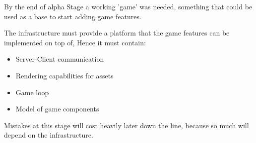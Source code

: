 By the end of alpha Stage a working 'game' was needed, something that could be used as a base to start adding game features.

The infrastructure must provide a platform that the game features can be implemented on top of, Hence it must contain:
\begin{itemize}
\item Server-Client communication
\item Rendering capabilities for assets
\item Game loop
\item Model of game components
\end{itemize}

Mistakes at this stage will cost heavily later down the line, because so much will depend on the infrastructure. 

\begin{comment}

alpha stage layout
------------------
features wanted at this stage:
    - networking
    - server client loop
    - game update model (lock-step no no no)
    - ship move orders
    - world rendering(easy debugging)
    - more focus around infrastructure than features

  - lack of libraries, implemeintg our own networking, GUI library.
  - implementation of network library.
  - server and client not distinquished just yet
  - game loop
  - lock-step big part
    - arguments for and against
  - integration of assets into game
  - API for game how entities are added
  - how generating diffs will work

  - infrastructure components
    - networking
    - gameploop
    - how the server and client synchronize
    - graphics


\end{comment}
